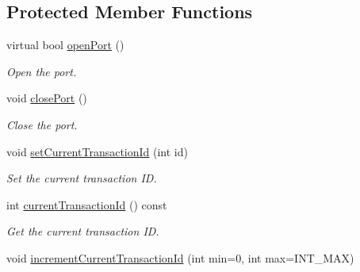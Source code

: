 \subsection*{Protected Member Functions}
\begin{DoxyCompactItemize}
\item 
virtual bool \hyperlink{classmdt_port_manager_aab594613e8985590c835194efbc27b5e}{openPort} ()
\begin{DoxyCompactList}\small\item\em Open the port. \end{DoxyCompactList}\item 
void \hyperlink{classmdt_port_manager_ace8065f1f5083041ee7f65c2892bc77d}{closePort} ()
\begin{DoxyCompactList}\small\item\em Close the port. \end{DoxyCompactList}\item 
\hypertarget{classmdt_port_manager_a3f1d25b2441c467c0de9908c73422a93}{
void \hyperlink{classmdt_port_manager_a3f1d25b2441c467c0de9908c73422a93}{setCurrentTransactionId} (int id)}
\label{classmdt_port_manager_a3f1d25b2441c467c0de9908c73422a93}

\begin{DoxyCompactList}\small\item\em Set the current transaction ID. \end{DoxyCompactList}\item 
\hypertarget{classmdt_port_manager_a19abf29c8948cde0337d67c9722c25aa}{
int \hyperlink{classmdt_port_manager_a19abf29c8948cde0337d67c9722c25aa}{currentTransactionId} () const }
\label{classmdt_port_manager_a19abf29c8948cde0337d67c9722c25aa}

\begin{DoxyCompactList}\small\item\em Get the current transaction ID. \end{DoxyCompactList}\item 
\hypertarget{classmdt_port_manager_a4d009936a0a5130f3bfecb69fee4ce42}{
void \hyperlink{classmdt_port_manager_a4d009936a0a5130f3bfecb69fee4ce42}{incrementCurrentTransactionId} (int min=0, int max=INT\_\-MAX)}
\label{classmdt_port_manager_a4d009936a0a5130f3bfecb69fee4ce42}


\end{DoxyCompactItemize}
